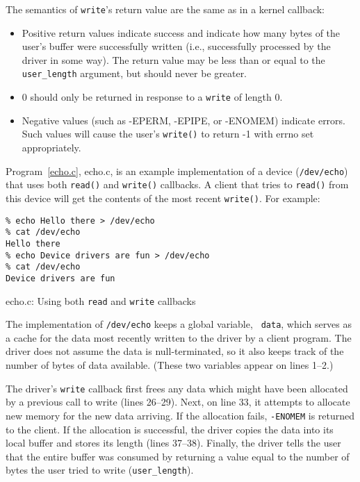 \documentclass{article}
\begin{document}
The semantics of {\tt write}'s return value are the same as in a
kernel callback:
\begin{itemize}
\item Positive return values indicate success and indicate how many
bytes of the user's buffer were successfully written (i.e.,
successfully processed by the driver in some way).  The return value
may be less than or equal to the {\tt user\_length} argument, but
should never be greater.
\item 0 should only be returned in response to a {\tt write} of length
0.
\item Negative values (such as -EPERM, -EPIPE, or -ENOMEM) indicate
errors.  Such values will cause the user's {\tt write()} to return -1
with errno set appropriately.
\end{itemize}

Program~\ref{echo.c}, echo.c, is an example implementation of a device
({\tt /dev/echo}) that uses both {\tt read()} and {\tt write()}
callbacks.  A client that tries to {\tt read()} from this device will
get the contents of the most recent {\tt write()}.  For example:\\
\begin{minipage}{\textwidth}
\vspace{\baselineskip}
\begin{verbatim}
% echo Hello there > /dev/echo
% cat /dev/echo
Hello there
% echo Device drivers are fun > /dev/echo
% cat /dev/echo
Device drivers are fun

\end{verbatim}
\end{minipage}

\begin{Program}
\caption{echo.c: Using both {\tt read} and {\tt write} callbacks}
\label{echo.c}
\end{Program}

The implementation of {\tt /dev/echo} keeps a global variable, {\tt
data}, which serves as a cache for the data most recently written to
the driver by a client program.  The driver does not assume the data
is null-terminated, so it also keeps track of the number of bytes of
data available.  (These two variables appear on lines 1--2.)

The driver's {\tt write} callback first frees any data which might
have been allocated by a previous call to write (lines 26--29).  Next,
on line 33, it attempts to allocate new memory for the new data
arriving.  If the allocation fails, {\tt -ENOMEM} is returned to the
client.  If the allocation is successful, the driver copies the data
into its local buffer and stores its length (lines 37--38).  Finally,
the driver tells the user that the entire buffer was consumed by
returning a value equal to the number of bytes the user tried to write
({\tt user\_length}).
\end{document}
